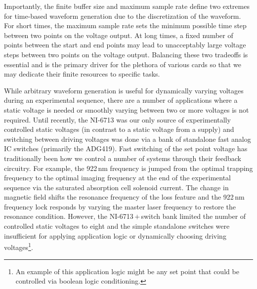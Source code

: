 Importantly, the finite buffer size and maximum sample rate define two extremes for time-based waveform generation due to the discretization of the waveform.
For short times, the maximum sample rate sets the minimum possible time step between two points on the voltage output.
At long times, a fixed number of points between the start and end points may lead to unacceptably large voltage steps between two points on the voltage output.
Balancing these two tradeoffs is essential and is the primary driver for the plethora of various cards so that we may dedicate their finite resources to specific tasks.

While arbitrary waveform generation is useful for dynamically varying voltages during an experimental sequence, there are a number of applications where a static voltage is needed or smoothly varying between two or more voltages is not required.
Until recently, the NI-6713 was our only source of experimentally controlled static voltages (in contrast to a static voltage from a supply) and switching between driving voltages was done via a bank of standalone fast analog IC switches (primarily the ADG419).
Fast switching of the set point voltage has traditionally been how we control a number of systems through their feedback circuitry.
For example, the 922\,nm frequency is jumped from the optimal trapping frequency to the optimal imaging frequency at the end of the experimental sequence via the saturated absorption cell solenoid current.
The change in magnetic field shifts the resonance frequency of the loss feature and the 922\,nm frequency lock responds by varying the master laser frequency to restore the resonance condition.
However, the NI-6713\,$+$\,switch bank limited the number of controlled static voltages to eight and the simple standalone switches were insufficient for applying application logic or dynamically choosing driving voltages\footnote{An example of this application logic might be any set point that could be controlled via boolean logic conditioning.}.


